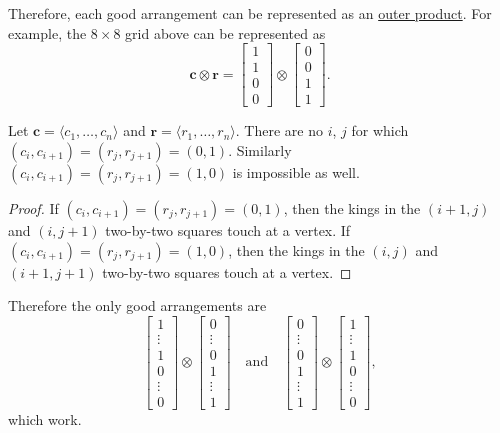 Therefore, each good arrangement can be represented as an \href{https://en.wikipedia.org/wiki/Outer_product}{outer product}. For example, the $8\times8$ grid above can be represented as
\[\mathbf c\otimes\mathbf r=\begin{bmatrix}1\\1\\0\\0\end{bmatrix}\otimes\begin{bmatrix}0\\0\\1\\1\end{bmatrix}.\]
\begin{claim}
    Let $\mathbf c=\langle c_1,\ldots,c_n\rangle$ and $\mathbf r=\langle r_1,\ldots,r_n\rangle$. There are no $i$, $j$ for which $(c_i,c_{i+1})=(r_j,r_{j+1})=(0,1)$. Similarly $(c_i,c_{i+1})=(r_j,r_{j+1})=(1,0)$ is impossible as well.
\end{claim}
\begin{proof}
    If $(c_i,c_{i+1})=(r_j,r_{j+1})=(0,1)$, then the kings in the $(i+1,j)$ and $(i,j+1)$ two-by-two squares touch at a vertex. If $(c_i,c_{i+1})=(r_j,r_{j+1})=(1,0)$, then the kings in the $(i,j)$ and $(i+1,j+1)$ two-by-two squares touch at a vertex.
\end{proof}

Therefore the only good arrangements are
\[
    \begin{bmatrix}
        1\\\vdots\\1\\0\\\vdots\\0
    \end{bmatrix}
    \otimes
    \begin{bmatrix}
        0\\\vdots\\0\\1\\\vdots\\1
    \end{bmatrix}
    \quad\text{and}\quad
    \begin{bmatrix}
        0\\\vdots\\0\\1\\\vdots\\1
    \end{bmatrix}
    \otimes
    \begin{bmatrix}
        1\\\vdots\\1\\0\\\vdots\\0
    \end{bmatrix},
\]
which work.

